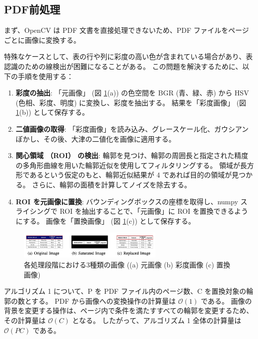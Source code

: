 \documentclass[uplatex, twocolumn,10pt]{jsarticle}
\begin{document}
\subsection{PDF前処理}
まず、OpenCV は PDF 文書を直接処理できないため、PDF ファイルをページごとに画像に変換する。

特殊なケースとして、表の行や列に彩度の高い色が含まれている場合があり、表認識のための線検出が困難になることがある。
この問題を解決するために、以下の手順を使用する：

\begin{enumerate}
    \item \textbf{彩度の抽出}:
    「元画像」 (図 \ref{fig2}(a)) の色空間を BGR (青、緑、赤) から HSV (色相、彩度、明度) に変換し、彩度を抽出する。
    結果を「彩度画像」 (図 \ref{fig2}(b)) として保存する。
    \item \textbf{二値画像の取得}:
    「彩度画像」を読み込み、グレースケール化、ガウシアンぼかし、その後、大津の二値化を画像に適用する。
    \item \textbf{関心領域 （ROI） の検出}:
    輪郭を見つけ、輪郭の周囲長と指定された精度の多角形曲線を用いた輪郭近似を使用してフィルタリングする。
    領域が長方形であるという仮定のもと、輪郭近似結果が 4 であれば目的の領域が見つかる。
    さらに、輪郭の面積を計算してノイズを除去する。
    \item \textbf{ROI を元画像に置換}:
    バウンディングボックスの座標を取得し、numpy スライシングで ROI を抽出することで、「元画像」に ROI を置換できるようにする。
    画像を「置換画像」 (図 \ref{fig2}(c)) として保存する。
\end{enumerate}

\begin{figure}[tp]
    \begin{center}
        \includegraphics*[width=7cm]{image/master/master2/Fig2.png}
        \caption{各処理段階における3種類の画像 ((a) 元画像 (b) 彩度画像 (c) 置換画像)}
        \label{fig2}
    \end{center}
\end{figure}

%
%
%
%
%
%
%
%
%
%

アルゴリズム 1 について、P を PDF ファイル内のページ数、C を置換対象の輪郭の数とする。
PDF から画像への変換操作の計算量は $\mathcal{O}(1)$ である。
画像の背景を変更する操作は、ページ内で条件を満たすすべての輪郭を変更するため、その計算量は $\mathcal{O}(C)$ となる。
したがって、アルゴリズム 1 全体の計算量は $\mathcal{O}(PC)$ である。
\end{document}
